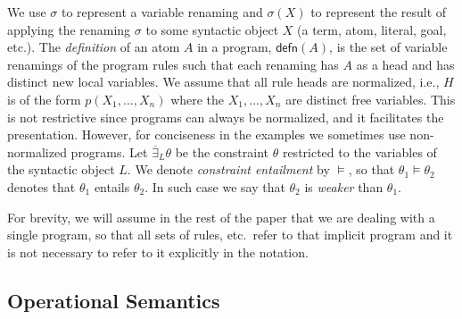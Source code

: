 \documentclass{llncs}
\newcommand{\defn}[1]
  {\ensuremath{\textsf{defn}(#1)}}
\begin{document}
We use $\sigma$ to represent a variable renaming and $\sigma(X)$ to
represent the result of applying the renaming $\sigma$ to some
syntactic object $X$ (a term, atom, literal, goal, etc.).
The \emph{definition} of an atom $A$ in a program, $\defn{A}$, is the
set of variable renamings of the program rules such that each renaming
has $A$ as a head and has distinct new local variables.
We assume that all rule heads are normalized, i.e., $H$ is of the form  
$p(X_1,...,X_n)$ where the $X_1,...,X_n$ are distinct free
variables. This is not restrictive since programs can always be
normalized, and it facilitates the presentation. However, for
conciseness in the examples
we sometimes use non-normalized programs.
Let $\overline{\exists}_L \theta$ be the constraint $\theta$
restricted to the variables of the syntactic object $L$. We denote
\emph{constraint entailment} by $\models$, so that $\theta_1\models
\theta_2$ denotes that $\theta_1$ entails $\theta_2$. In such case we
say that $\theta_2$ is \emph{weaker} than $\theta_1$.

For brevity, we will assume in the rest of the paper that we
are dealing with a single program, so that all sets of rules, etc.\
refer to that implicit program and it is not necessary to refer to it
explicitly in the notation.



\subsection{Operational Semantics}
\end{document}
